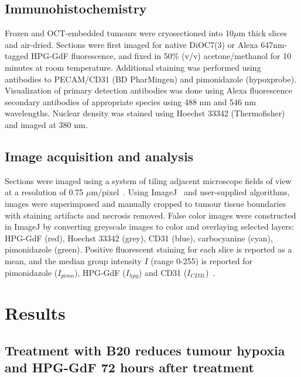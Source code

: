 \subsection{Immunohistochemistry}
Frozen and OCT-embedded tumours were cryosectioned into 10$\mu$m thick slices and air-dried.
Sections were first imaged for native DiOC7(3) or Alexa 647nm-tagged \acs{HPG-GdF} fluorescence, and fixed in 50\% (v/v) acetone/methanol for 10 minutes at room temperature.
Additional staining was performed using antibodies to PECAM/CD31 (BD PharMingen) and pimonidazole (hypoxprobe).
Visualization of primary detection antibodies was done using Alexa fluorescence secondary antibodies of appropriate species using 488 nm and 546 nm wavelengths.
Nuclear density was stained using Hoechst 33342 (Thermofisher) and imaged at 380 nm.

\subsection{Image acquisition and analysis}
Sections were imaged using a system of tiling adjacent microscope fields of view at a resolution of 0.75 $\mu$m/pixel~\cite{Kyle:2007ch}.
Using ImageJ~\cite{Collins:2007jr} and user-supplied algorithms, images were superimposed and manually cropped to tumour tissue boundaries with staining artifacts and necrosis removed.
False color images were constructed in ImageJ by converting greyscale images to color and overlaying selected layers: \acs{HPG-GdF} (red), Hoechst 33342 (grey), CD31 (blue), carbocyanine (cyan), pimonidazole (green).
Positive fluorescent staining for each slice is reported as a mean, and the median group intensity $I$ (range 0-255) is reported for pimonidazole ($I_{pimo}$), \acs{HPG-GdF} ($I_{hpg}$) and CD31 ($I_{CD31}$)~.

\section{Results}

\subsection{Treatment with B20 reduces tumour hypoxia and \acs{HPG-GdF} 72 hours after treatment}


